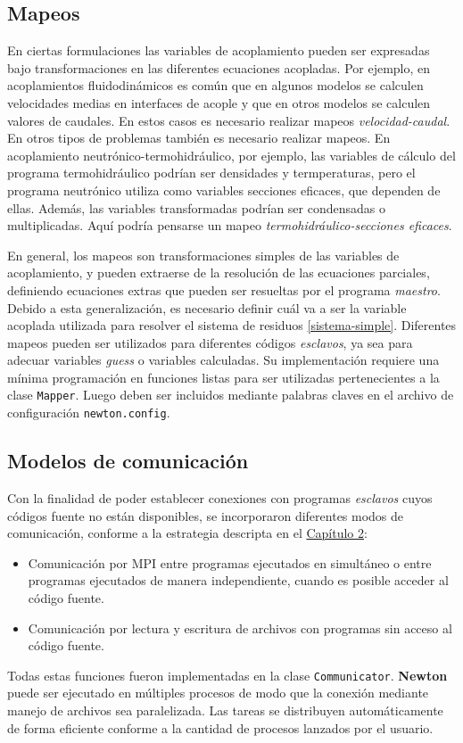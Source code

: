 \subsection*{Mapeos}
\label{ap2:mappers}

En ciertas formulaciones las variables de acoplamiento pueden ser expresadas bajo transformaciones en las diferentes ecuaciones acopladas.
Por ejemplo, en acoplamientos fluidodinámicos es común que en algunos modelos se calculen velocidades medias en interfaces de acople
y que en otros modelos se calculen valores de caudales.
En estos casos es necesario realizar mapeos \textit{velocidad-caudal}.
En otros tipos de problemas también es necesario realizar mapeos.
En acoplamiento neutrónico-termohidráulico, por ejemplo, las variables de cálculo del programa termohidráulico podrían ser densidades y termperaturas,
pero el programa neutrónico utiliza como variables secciones eficaces, que dependen de ellas.
Además, las variables transformadas podrían ser condensadas o multiplicadas.
Aquí podría pensarse un mapeo \textit{termohidráulico-secciones eficaces}.

En general, los mapeos son transformaciones simples de las variables de acoplamiento, y pueden extraerse de la resolución de las ecuaciones parciales,
definiendo ecuaciones extras que pueden ser resueltas por el programa \textit{maestro}.
Debido a esta generalización, es necesario definir cuál va a ser la variable acoplada utilizada para resolver el sistema de residuos \ref{sistema-simple}.
Diferentes mapeos pueden ser utilizados para diferentes códigos \textit{esclavos}, ya sea para adecuar variables \textit{guess} o variables calculadas.
Su implementación requiere una mínima programación en funciones listas para ser utilizadas pertenecientes a la clase \texttt{Mapper}.
Luego deben ser incluidos mediante palabras claves en el archivo de configuración \texttt{newton.config}.

\subsection*{Modelos de comunicación}
\label{ap2:comm}

Con la finalidad de poder establecer conexiones con programas \textit{esclavos} cuyos códigos fuente no están disponibles,
se incorporaron diferentes modos de comunicación, conforme a la estrategia descripta en el \hyperlink{chapter.2}{Capítulo 2}:
\begin{itemize}
\item Comunicación por MPI entre programas ejecutados en simultáneo o entre programas ejecutados de manera independiente, cuando es posible acceder al código fuente.
\item Comunicación por lectura y escritura de archivos con programas sin acceso al código fuente.
\end{itemize}
Todas estas funciones fueron implementadas en la clase \texttt{Communicator}.
\textbf{Newton} puede ser ejecutado en múltiples procesos de modo que la conexión mediante manejo de archivos sea paralelizada.
Las tareas se distribuyen automáticamente de forma eficiente conforme a la cantidad de procesos lanzados por el usuario.

